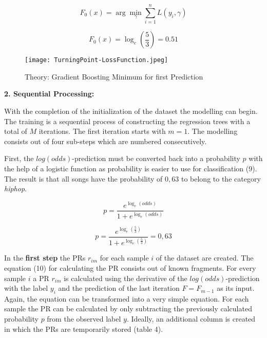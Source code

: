 \begin{equation}
    F_{0}(x) = \arg \min_{\gamma } \sum_{i= 1}^{n} L(y_{i}, \gamma)
\end{equation}

\begin{equation*}
    F_{0}(x) = \log_{e}(\frac{5}{3}) = 0.51
\end{equation*}

\begin{figure}[H]
    \centering
    \caption[]{Theory: Gradient Boosting Minimum for first Prediction}
	\label{TurningPoint-LossFunctio}
    \texttt{[image: TurningPoint-LossFunction.jpeg]}
\end{figure}

\textbf{2. Sequential Processing:}

With the completion of the initialization of the dataset the modelling can begin. The training is a sequential 
process of constructing the regression trees with a total of \(M\) iterations. The first iteration 
starts with \(m = 1\). The modelling consists out of four sub-steps which are numbered consecutively.

First, the \(log(odds)\)-prediction must be converted back into a probability \(p\) with the help of a 
logistic function as probability is easier to use for classification (9). The result is 
that all songs have the probability of \(0,63\) to belong to the category \emph{hiphop}.

\begin{equation}
p = \frac{e^{\log_{e}(odds)}}{1 + e^{\log_{e}(odds)}} 
\end{equation}

\begin{equation*}
p = \frac{e^{\log_{e}(\frac{5}{3})}}{1 + e^{\log_{e}(\frac{5}{3})}} = 0,63
\end{equation*}

In the \textbf{first step} the \ac{PR}s \(r_{im}\) for each sample \(i\) of the dataset are created. The equation (10) 
for calculating the \ac{PR} consists out of known fragments. For every sample \(i\) a PR \(r_{im}\) 
is calculated using the derivative of the \(log(odds)\)-prediction with the label \(y_{i}\) and the 
prediction of the last iteration \(F = F_{m - 1}\) as its input. Again, the equation can be 
transformed into a very simple equation. For each sample the \ac{PR} can be calculated by only 
subtracting the previously calculated probability \(p\) from the observed label \(y\). Ideally, an additional 
column is created in which the PRs are temporarily stored (table 4). 

